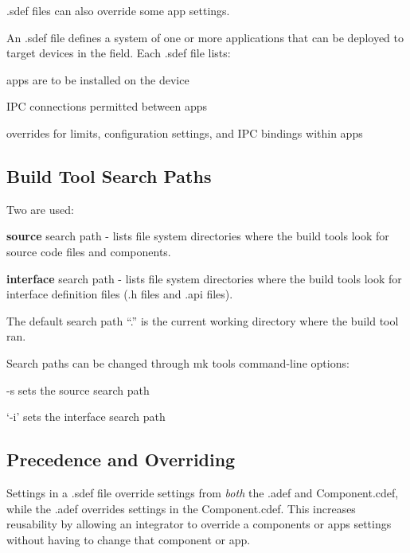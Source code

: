 .sdef files can also override some app settings.

An {\ttfamily .sdef} file defines a system of one or more applications that can be deployed to target devices in the field. Each {\ttfamily .sdef} file lists\+:
\begin{DoxyItemize}
\item apps are to be installed on the device
\item I\+P\+C connections permitted between apps
\item overrides for limits, configuration settings, and I\+P\+C bindings within apps
\end{DoxyItemize}\hypertarget{def_files_overview_defFilesOverview_searchPaths}{}\subsection{Build Tool Search Paths}\label{def_files_overview_defFilesOverview_searchPaths}
Two are used\+:
\begin{DoxyItemize}
\item {\bfseries source} search path -\/ lists file system directories where the build tools look for source code files and components.
\item {\bfseries interface} search path -\/ lists file system directories where the build tools look for interface definition files (.h files and .api files).
\end{DoxyItemize}

The default search path “.\+” is the current working directory where the build tool ran.

Search paths can be changed through mk tools command-\/line options\+:
\begin{DoxyItemize}
\item \textquotesingle{}-\/s\textquotesingle{} sets the source search path
\item ‘-\/i’ sets the interface search path
\end{DoxyItemize}


\hypertarget{def_files_overview_defFilesOverview_overriding}{}\subsection{Precedence and Overriding}\label{def_files_overview_defFilesOverview_overriding}
Settings in a {\ttfamily .sdef} file override settings from {\itshape both} the {\ttfamily .adef} and {\ttfamily Component.\+cdef}, while the {\ttfamily .adef} overrides settings in the {\ttfamily Component.\+cdef}. This increases reusability by allowing an integrator to override a component\textquotesingle{}s or app\textquotesingle{}s settings without having to change that component or app.

